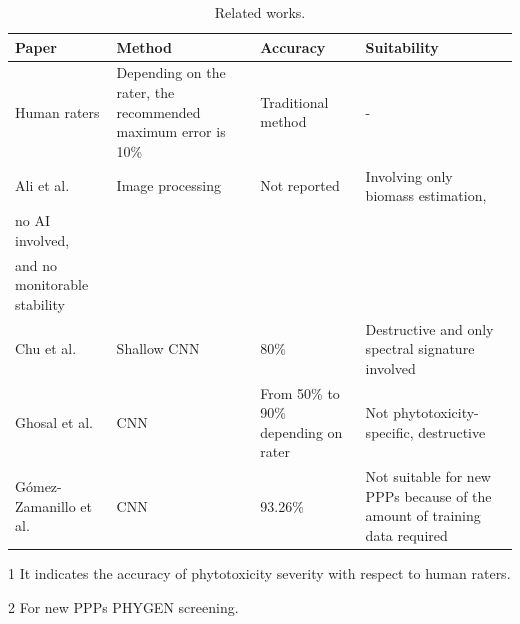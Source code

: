 \documentclass[12pt,a4paper,oneside]{report}
\begin{document}
\begin{landscape}
    \begin{table}[ht]
        \centering
        \begin{adjustbox}{center}
        \begin{threeparttable}
            \caption{Related works.}
            \begin{tabularx}{\textwidth}{p{3cm} p{3cm} p{3cm} p{6cm}}
                \hline
                \textbf{Paper} & \textbf{Method} & \textbf{Accuracy\tnote{1}} & \textbf{Suitability\tnote{2}} \\
                \hline
                Human raters & Depending on the rater, the recommended maximum error is 10\% \cite{chiangEffectsRaterBias2016} & Traditional method & - \\
                \hline
                Ali et al. \cite{aliUseImageAnalysis2013} & Image processing & Not reported & Involving only biomass estimation, \\ no AI involved, \\ and no monitorable stability \\
                \hline
                Chu et al. \cite{chuHyperspectralImagingShallow2022} & Shallow CNN & 80\% & Destructive and only spectral signature involved \\
                \hline
                Ghosal et al. \cite{ghosalExplainableDeepMachine2018} & CNN & From 50\% to 90\% depending on rater & Not phytotoxicity-specific, destructive \\
                \hline
                Gómez-Zamanillo et al. \cite{gomez-zamanilloDamageAssessmentSoybean2023} & CNN & 93.26\% & Not suitable for new PPPs because of the amount of training data required \\
                \hline
            \end{tabularx}
            \begin{tablenotes}
                \item[1] It indicates the accuracy of phytotoxicity severity with respect to human raters.
                \item[2] For new PPPs PHYGEN screening.
            \end{tablenotes}
        \end{threeparttable}
        \end{adjustbox}
    \end{table}
\end{landscape}
    
\end{document}
